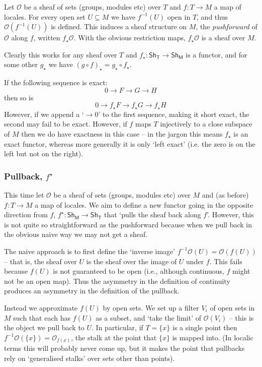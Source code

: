 \documentclass[oneside,english]{amsbook}
\numberwithin{section}{chapter}
\theoremstyle{plain}
\theoremstyle{definition}
\newcommand{\cat}[1]{\boldsymbol{\mathsf{#1}}}
\begin{document}
Let $\mathscr{O}$ be a sheaf of sets (groups, modules etc) over $T$ and $f:T\to M$ a map of locales. For every open set $U\subseteq M$ we have $f^{-1}(U)$ open in $T$, and thus $\mathscr{O}(f^{-1}(U))$ is defined. This induces a sheaf structure on $M$, the \emph{pushforward} of $\mathscr{O}$ along $f$, written $f_\star\mathscr{O}$. With the obvious restriction maps, $f_\star\mathscr{O}$ is a sheaf over $M$. 

Clearly this works for any sheaf over $T$ and $f_\star:\cat{Sh_T}\to\cat{Sh_M}$ is a functor, and for some other $g_\star$ we have $(g\circ f)_\star = g_\star\circ f_\star$.

If the following sequence is exact:
\[
	0\to F\to G\to H
\]
then so is
\[
0\to f_\star F\to f_\star G\to f_\star H
\]
However, if we append a `$\to 0$' to the first sequence, making it short exact, the second may fail to be exact. However, if $f$ maps $T$ injectively to a close subspace of $M$ then we do have exactness in this case -- in the jargon this means $f_\star$ is an exact functor, whereas more generally it is only `left exact' (i.e. the zero is on the left but not on the right).

\subsubsection{Pullback, $f^\star$}

This time let $\mathscr{O}$ be a sheaf of sets (groups, modules etc) over $M$ and (as before) $f:T\to M$ a map of locales. We aim to define a new functor going in the opposite direction from $f$, $f^\star:\cat{Sh_M}\to\cat{Sh_T}$ that `pulls the sheaf back along $f$'. However, this is not quite so straightforward as the pushforward because when we pull back in the obvious naive way we may not get a sheaf.

The naive approach is to first define the `inverse image' $f^{-1}\mathscr{O}(U) = \mathscr{O}(f(U))$ -- that is, the sheaf over $U$ is the sheaf over the image of $U$ under $f$. This fails because $f(U)$ is not guaranteed to be open (i.e., although continuous, $f$ might not be an open map). Thus the asymmetry in the definition of continuity produces an asymmetry in the definition of the pullback.

Instead we approximate $f(U)$ by open sets. We set up a filter $V_i$ of open sets in $M$ such that each has $f(U)$ as a subset, and `take the limit' of $\mathscr{O}(V_i)$ -- this is the object we pull back to $U$. In particular, if $T=\{x\}$ is a single point then $f^{-1}\mathscr{O}(\{x\}) = \mathscr{O}_{f(x)}$, the stalk at the point that $\{x\}$ is mapped into. (In localic terms this will probably never come up, but it makes the point that pullbacks rely on `generalised stalks' over sets other than points).
\end{document}
